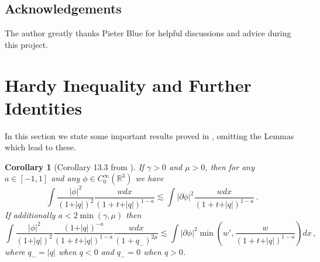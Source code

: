 \documentclass[11pt, a4paper]{amsart}
\numberwithin{equation}{section}
\newtheorem{lemma}[theorem]{Lemma}
\newtheorem{corollary}[theorem]{Corollary}
\numberwithin{theorem}{section}
\newcommand{\R}{\mathbb{R}}
\newcommand{\p}{\partial}
\newcommand{\tee}{{\mathbb{T}^d}}
\newcommand{\pgood}{\overline{\partial}}
\newcommand{\tbox}{\widetilde{\Box}}
\newcommand{\UU}{{\mathcal{U} \mathcal{U}}}
\newcommand{\qv}{\vert q \vert}
\begin{document}
%

\subsection*{Acknowledgements}
The author greatly thanks Pieter Blue for helpful discussions and advice during this project. 

\section{Hardy Inequality and Further Identities} \label{section:hardy}
In this section we state some important results proved in \cite{LR:04}, omitting the Lemmas which lead to these. 
\begin{corollary}[Corollary 13.3 from \cite{LR:04}] \label{corol-13.3}
If $\gamma >0$ and $\mu >0$, then for any $a \in [-1, 1]$ and any $\phi \in C^\infty_0(\R^3)$ we have
$$ \int \frac{\vert \phi \vert^2}{(1+\qv)^2} \frac{w dx}{(1+t+\qv )^{1-a}} \lesssim \int \vert \p \phi \vert^2 \frac{w dx}{(1+t+\qv )^{1-a}} \,. $$
If additionally $a<2 \min (\gamma, \mu)$ then
$$ \int \frac{\vert \phi \vert^2}{(1+\qv)^2} \frac{(1+\qv)^{-a}}{(1+t+\qv)^{1-a}} \frac{w dx}{(1+q_- )^{2 \mu}} \lesssim \int \vert \p \phi \vert^2 \min \left( w', \frac{w}{(1+t+\qv )^{1-a}} \right) dx \,,$$
where $q_- = \qv$ when $q<0$ and $q_- = 0$ when $q>0$. 
\end{corollary}
\end{document}
